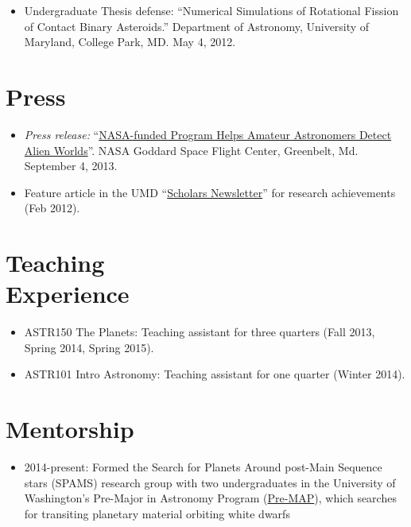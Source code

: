 \documentclass[margin]{res}
\begin{document}
\begin{resume}
\begin{itemize}
\item Undergraduate Thesis defense:  ``Numerical Simulations of Rotational Fission of Contact Binary Asteroids.'' Department of Astronomy, University of Maryland, College Park, MD. May 4, 2012.\\
\end{itemize}



\section{Press} 
\begin{itemize}
\item {\it Press release:} ``\href{http://www.nasa.gov/content/nasa-funded-program-helps-amateur-astronomers-detect-alien-worlds/}{NASA-funded Program Helps Amateur Astronomers Detect Alien Worlds}''. NASA Goddard Space Flight Center, Greenbelt, Md. September 4, 2013.

\item Feature article in the UMD ``\href{http://www.scholars.umd.edu/news/newsletter/363-february-2012-issue-1}{Scholars Newsletter}'' for research achievements (Feb 2012).\\
\end{itemize}              


\section{Teaching \\Experience}
\begin{itemize}   
\item ASTR150 The Planets: Teaching assistant for three quarters (Fall 2013, Spring 2014, Spring 2015).

\item ASTR101 Intro Astronomy: Teaching assistant for one quarter (Winter 2014). \\
\end{itemize}

\section{Mentorship}
\begin{itemize}   
\item 2014-present: Formed the Search for Planets Around post-Main Sequence stars (SPAMS) research group with two undergraduates in the University of Washington's Pre-Major in Astronomy Program (\href{http://www.astro.washington.edu/users/premap/}{Pre-MAP}), which searches for transiting planetary material orbiting white dwarfs\\
\end{itemize}


\end{resume}
\end{document}
